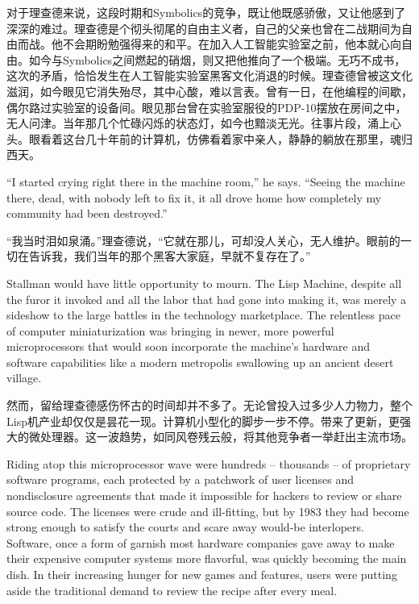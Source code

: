 \ifdefined\chs
对于理查德来说，这段时期和Symbolics的竞争，既让他既感骄傲，又让他感到了深深的难过。理查德是个彻头彻尾的自由主义者，自己的父亲也曾在二战期间为自由而战。他不会期盼勉强得来的和平。在加入人工智能实验室之前，他本就心向自由。如今与Symbolics之间燃起的硝烟，则又把他推向了一个极端。无巧不成书，这次的矛盾，恰恰发生在人工智能实验室黑客文化消退的时候。理查德曾被这文化滋润，如今眼见它消失殆尽，其中心酸，难以言表。曾有一日，在他编程的间歇，偶尔路过实验室的设备间。眼见那台曾在实验室服役的PDP-10摆放在房间之中，无人问津。当年那几个忙碌闪烁的状态灯，如今也黯淡无光。往事片段，涌上心头。眼看着这台几十年前的计算机，仿佛看着家中亲人，静静的躺放在那里，魂归西天。
\fi

\ifdefined\eng
``I started crying right there in the machine room,'' he says. ``Seeing the machine there, dead, with nobody left to fix it, it all drove home how completely my community had been destroyed.''
\fi

\ifdefined\chs
``我当时泪如泉涌。''理查德说，``它就在那儿，可却没人关心，无人维护。眼前的一切在告诉我，我们当年的那个黑客大家庭，早就不复存在了。''
\fi

\ifdefined\eng
Stallman would have little opportunity to mourn. The Lisp Machine, despite all the furor it invoked and all the labor that had gone into making it, was merely a sideshow to the large battles in the technology marketplace. The relentless pace of computer miniaturization was bringing in newer, more powerful microprocessors that would soon incorporate the machine's hardware and software capabilities like a modern metropolis swallowing up an ancient desert village.
\fi

\ifdefined\chs
然而，留给理查德感伤怀古的时间却并不多了。无论曾投入过多少人力物力，整个Lisp机产业却仅仅是昙花一现。计算机小型化的脚步一步不停。带来了更新，更强大的微处理器。这一波趋势，如同风卷残云般，将其他竞争者一举赶出主流市场。
\fi

\ifdefined\eng
Riding atop this microprocessor wave were hundreds -- thousands -- of proprietary software programs, each protected by a patchwork of user licenses and nondisclosure agreements that made it impossible for hackers to review or share source code. The licenses were crude and ill-fitting, but by 1983 they had become strong enough to satisfy the courts and scare away would-be interlopers. Software, once a form of garnish most hardware companies gave away to make their expensive computer systems more flavorful, was quickly becoming the main dish. In their increasing hunger for new games and features, users were putting aside the traditional demand to review the recipe after every meal.
\fi

